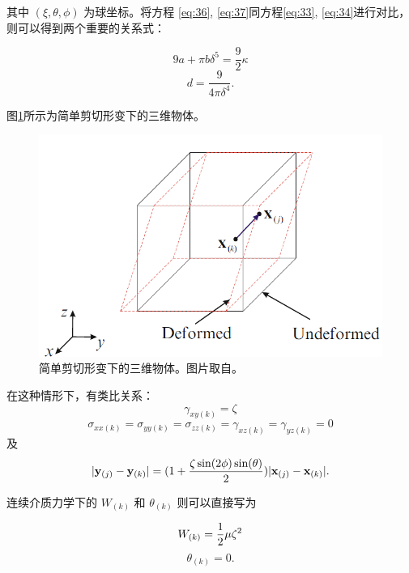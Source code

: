 {{{其中 $(\xi,\theta,\phi)$ 为球坐标。将方程 \ref{eq:36}, \ref{eq:37}同方程\ref{eq:33}, \ref{eq:34}进行对比，则可以得到两个重要的关系式：

\begin{equation}
9a + \pi b\delta^5 = \frac{9}{2}\kappa
\label{eq:38}
\end{equation}
\begin{equation}
d = \frac{9}{4\pi\delta^4}.
\label{eq:39}
\end{equation}


图\ref{pdm_simple_shear}所示为简单剪切形变下的三维物体。
\begin{figure}[htbp!]
  \centering
  \captionsetup{justification=centering}
  \includegraphics[width=0.5\linewidth]{chap/image/pdm_simple_shear}

  \caption{\label{pdm_simple_shear}
           简单剪切形变下的三维物体。图片取自。
          }
\end{figure}

在这种情形下，有类比关系：
\begin{equation}
\gamma_{xy(k)} = \zeta
\label{eq:40}
\end{equation}
\begin{equation}
\sigma_{xx(k)} = \sigma_{yy(k)} = \sigma_{zz(k)} = \gamma_{xz(k)} =\gamma_{yz(k)} = 0
\label{eq:41}
\end{equation}
及
\begin{equation}
|\mathbf{y}_{(j)} - \mathbf{y}_{(k)}| = (1+\frac{\zeta\sin(2\phi)\sin(\theta)}{2})|\mathbf{x}_{(j)} - \mathbf{x}_{(k)}|.
\label{eq:42}
\end{equation}

连续介质力学下的 $W_{(k)}$ 和 $\theta_{(k)}$ 则可以直接写为

\begin{equation}
W_{(k)} = \frac{1}{2}\mu\zeta^2\\
\label{eq:43}
\end{equation}
\begin{equation}
\theta_{(k)} = 0.
\label{eq:44}
\end{equation}

}}}

